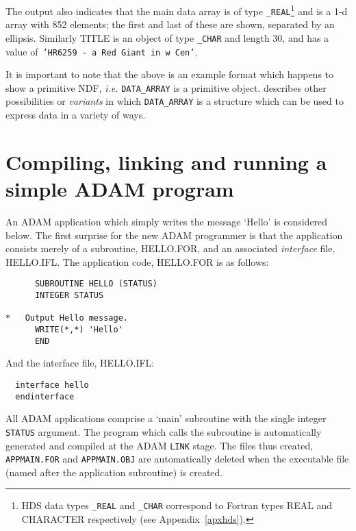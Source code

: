 The output also indicates that the main data array is of type 
{\tt\_REAL}\footnote{HDS data types {\tt\_REAL} and {\tt\_CHAR} correspond to Fortran types REAL
and CHARACTER respectively (see Appendix~\ref{apxhds}).}
and is a 1-d array with 852 elements;
the first and last of these are shown, separated by an ellipsis.
Similarly  TITLE is an object of type {\tt\_CHAR} and length 
30, and has a value of\ {\tt 'HR6259 - a Red Giant in w Cen'}.

It is important to note that the above  is an example format which
happens to show a primitive NDF, 
{\it i.e.} {\tt DATA\_ARRAY} is a primitive object.
 describes other possibilities or {\sl variants\/} in
which {\tt DATA\_ARRAY} is a structure which  can be used to express
data in a variety of ways.


\newpage
\section{Compiling, linking and running a simple ADAM program\label{comp}}

An ADAM application which simply writes the message {`Hello'}
is considered below.
The first surprise for the new ADAM programmer is that the application 
consists merely of a subroutine, HELLO.FOR, and an
associated {\sl interface\/} file, HELLO.IFL.
The application code, HELLO.FOR is as follows:
\begin{verbatim}
      SUBROUTINE HELLO (STATUS)
      INTEGER STATUS

*   Output Hello message.
      WRITE(*,*) 'Hello'
      END                 
\end{verbatim}
And the  interface file, HELLO.IFL:
\begin{verbatim}
  interface hello
  endinterface
\end{verbatim}
All ADAM applications comprise a `main' subroutine with the single
integer {\tt STATUS} argument.
The program which calls the subroutine is automatically
generated and compiled at the ADAM {\tt LINK} stage.
The files thus created, {\tt APPMAIN.FOR} and {\tt APPMAIN.OBJ} 
are automatically deleted when the executable file (named after the 
application subroutine) is created.

